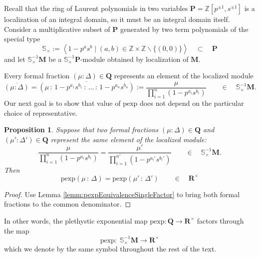 \documentclass{amsart}
\newtheorem{proposition}[theorem]{Proposition}
\begin{document}
Recall that the ring of Laurent polynomials in two variables $\mathbf P=\mathbb Z[p^{\pm1},s^{\pm1}]$ is a localization of an integral domain, so it must be an integral domain itself. Consider a multiplicative subset of $\mathbf P$ generated by two term polynomials of the special type
 \begin{equation*}
 \mathbb S_\times:=\left\langle1- p^as^b\;\big|\; (a,b)\in\mathbb Z\times\mathbb Z\backslash\{(0,0)\}\right\rangle\quad\subset\quad\mathbf P
 \end{equation*}
and let $\mathbb S_\times^{-1}\mathbf M$ be a $\mathbb S_\times^{-1}\mathbf P$-module obtained by localization of $\mathbf M$.

Every formal fraction $(\mu:\Delta)\in\mathbf Q$ represents an element of the localized module
\begin{equation*}
\overline{(\mu:\Delta)}=\overline{(\mu\,\mathbf{:}\,1-p^{a_1}s^{b_1}\,\mathbf{:}\,\dots\,\mathbf{:}\,1-p^{a_n}s^{b_n})}:=\frac{\mu}{\prod_{i=1}^n(1-p^{a_i}s^{b_i})}\qquad\in\quad\mathbb S_\times^{-1}\mathbf M.
\end{equation*}
Our next goal is to show that value of $\mathrm{pexp}$ does not depend on the particular choice of representative.

\begin{proposition}
    Suppose that two formal fractions $(\mu:\Delta)\in\mathbf Q$ and $(\mu':\Delta')\in\mathbf Q$ represent the same element of the localized module:
    \begin{equation}
    \frac{\mu}{\prod_{i=1}^n(1-p^{a_i}s^{b_i})}=\frac{\mu'}{\prod_{i=1}^{n'}(1-p^{a_i'}s^{b_i'})}\qquad\in\quad\mathbb S_\times^{-1}\mathbf M.
    \label{eq:FormalFractionsEquivalent}
    \end{equation}
    Then
    \begin{equation*}
    \mathrm{pexp}(\mu\,\mathbf{:}\,\Delta)=\mathrm{pexp}(\mu'\,\mathbf{:}\,\Delta')\qquad \in\quad \mathbf R^\times
    \end{equation*}
\label{prop:pexpFormalFractionsExquivalence}
\end{proposition}
\begin{proof}
Use Lemma \ref{lemm:pexpEquivalenceSingleFactor} to bring both formal fractions to the common denominator.
\end{proof}

In other words, the plethystic exponential map $\mathrm{pexp}:\mathbf Q\rightarrow\mathbf R^\times$ factors through the map
\begin{equation*}
\mathrm{pexp}:\;\mathbb S_\times^{-1}\mathbf M\rightarrow\mathbf R^\times
\end{equation*}
which we denote by the same symbol throughout the rest of the text.
\end{document}
